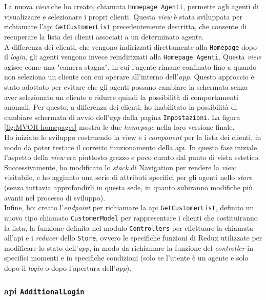 La nuova \textit{view} che ho creato, chiamata \texttt{Homepage Agenti}, permette agli agenti di visualizzare e 
selezionare i propri clienti. Questa \textit{view} è stata sviluppata per richiamare l'\gls{api} \texttt{GetCustomerList} 
precedentemente descritta, che consente di recuperare la lista dei clienti associati a un determinato agente.\\
A differenza dei clienti, che vengono indirizzati direttamente alla \texttt{Homepage} dopo il \textit{login}, gli 
agenti vengono invece reindirizzati alla \texttt{Homepage Agenti}. Questa \textit{view} agisce come una "camera stagna", 
in cui l'agente rimane confinato fino a quando non seleziona un cliente con cui operare all'interno dell'\textit{app}. 
Questo approccio è stato adottato per evitare che gli agenti possano cambiare la schermata senza aver selezionato 
un cliente e ridurre quindi la possibilità di comportamenti anomali. Per questo, a differenza dei clienti, ho inabilitato 
la possibilità di cambiare schermata di avvio dell'\textit{app} dalla pagina \texttt{Impostazioni}.
La figura \ref{fig:MVOR homepages} mostra le due \textit{homepage} nella loro versione finale.\\
Ho iniziato lo sviluppo costruendo la view e i \textit{component} per la lista dei clienti, in modo da poter testare il 
corretto funzionamento della \gls{api}. In questa fase iniziale, l'aspetto della \textit{view} era piuttosto grezzo e poco 
curato dal punto di vista estetico. Successivamente, ho modificato lo \textit{stack} di Navigation per rendere la \textit{view} 
visitabile, e ho aggiunto una serie di attributi specifici per gli agenti nello \textit{store} (senza tuttavia approfondirli 
in questa sede, in quanto subiranno modifiche più avanti nel processo di sviluppo).\\
Infine, ho: creato l'\textit{endpoint} per richiamare la \gls{api} \texttt{GetCustomerList}, definito un nuovo tipo chiamato 
\texttt{CustomerModel} per rappresentare i clienti che costituiranno la lista, la funzione definita nel modulo 
\texttt{Controllers} per effettuare la chiamata all'\gls{api} e i \textit{reducer} dello \texttt{Store}, 
ovvero le specifiche funzioni di Redux utilizzate per modificare lo stato dell'\textit{app}, in modo da richiamare 
la funzione del \textit{controller} in specifici momenti e in specifiche condizioni (solo se l'utente è un agente e 
solo dopo il \textit{login} o dopo l'apertura dell'\textit{app}). 

\subsubsection{\gls{api} \texttt{AdditionalLogin}}

